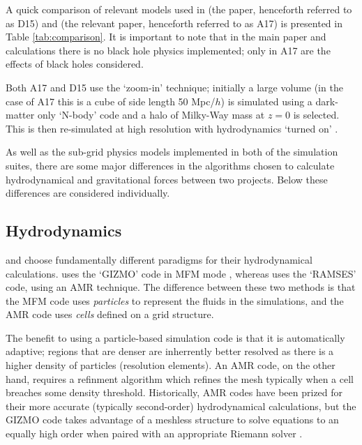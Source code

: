 A quick comparison of relevant models used in \citet{dubois_black_2015}
(the \hagn{} paper, henceforth referred to as D15) and
\citet{angles-alcazar_black_2017} (the relevant \fire{} paper, henceforth
referred to as A17) is presented in Table \ref{tab:comparison}. It is important
to note that in the main \fire{} paper \citep{hopkins_fire-2_2017} and 
calculations there is no black hole physics implemented; only in A17 are
the effects of black holes considered.

Both A17 and D15 use the `zoom-in' technique; initially a large volume (in the
case of A17 this is a cube of side length 50 Mpc/$h$) is simulated using a
dark-matter only `N-body' code and a halo of Milky-Way mass at $z=0$ is
selected. This is then re-simulated at high resolution with hydrodynamics
`turned on' \citep[see][for details of the initial
simulations]{kaviraj_horizon-agn_2017, wetzel_reconciling_2016}. 

As well as the sub-grid physics models implemented in both of the simulation
suites, there are some major differences in the algorithms chosen to calculate
hydrodynamical and gravitational forces between two projects. Below these
differences are considered individually.

\subsection{Hydrodynamics}

\hagn{} and \fire{} choose fundamentally different paradigms for their
hydrodynamical calculations. \fire{} uses the `GIZMO' code in MFM mode \citep[a
meshless finite mass method, see][]{hopkins_gizmo:_2015}, whereas \hagn{} uses
the `RAMSES' code, using an AMR \citep[adaptive mesh refinment,
see][]{teyssier_cosmological_2002} technique. The difference between these two
methods is that the MFM code uses \emph{particles} to represent the fluids in
the simulations, and the AMR code uses \emph{cells} defined on a grid
structure.

The benefit to using a particle-based simulation code is that it is
automatically adaptive; regions that are denser are inherrently better resolved
as there is a higher density of particles (resolution elements). An AMR code,
on the other hand, requires a refinment algorithm which refines the mesh
typically when a cell breaches some density threshold. Historically, AMR codes
have been prized for their more accurate (typically second-order)
hydrodynamical calculations, but the GIZMO code takes advantage of a meshless
structure \citep[as opposed to the usual smoothed particle hydrodynamics used
for particle-based simulations, see e.g.][]{springel_cosmological_2005} to
solve equations to an equally high order when paired with an appropriate
Riemann solver \citep{hopkins_gizmo:_2015, hopkins_new_2017}.

